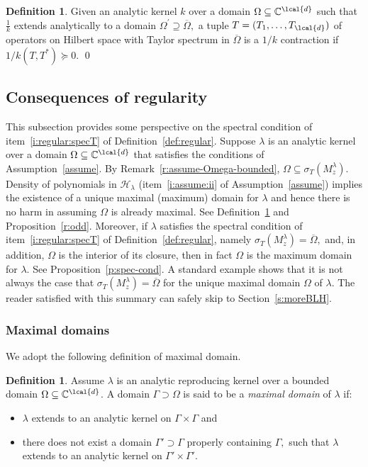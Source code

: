 \documentclass[a4paper,reqno,index]{amsart}
\numberwithin{equation}{section}
\newcommand{\CC}{\mathbb{C}}
\newcommand{\cH}{\mathcal{H}}
\newcommand{\specT}{\sigma_T}  %
\newcommand{\genl}{\lambda} %
\newcommand{\ol}[1]{\overline{#1}}
\theoremstyle{definition}
\newtheorem{definition}[theorem]{Definition}
\begin{document}
\begin{definition}
    \label{1kdef}
       Given an analytic  kernel  $k$ over a domain $\Omega\subseteq \CC^{\lcal{d}}$ such that $\frac{1}{k}$ 
       extends analytically to a domain $\Omega^\prime\supseteq \ol{\Omega},$ 
     a tuple $T=(T_1,\dots,T_{\lcal{d}})$ of operators on Hilbert space with Taylor spectrum in $\overline{\Omega}$
     is a $1/k$ contraction if  $1/k(T,T^*)\succeq 0$. 
\qed\end{definition}


  
\subsection{Consequences of regularity}\label{subsecconseq}
 This subsection provides some perspective on the spectral condition of item~\ref{i:regular:specT} of 
 Definition~\ref{def:regular}.
 Suppose $\lambda$ is an analytic kernel over a domain $\Omega\subseteq \CC^{\lcal{d}}$
 that satisfies the conditions of Assumption~\ref{assume}. 
 By Remark~\ref{r:assume-Omega-bounded}, $\Omega\subseteq \specT(M_z^\lambda).$
 Density of polynomials in $\cH_\lambda$  (item~\ref{i:assume:ii} of Assumption~\ref{assume}) implies the existence
 of a unique maximal (maximum) domain for $\lambda$
 and hence there is no harm in assuming $\Omega$ is
 already maximal. See Definition~\ref{maximaldef} and Proposition~\ref{r:odd}.
 Moreover, if $\lambda$ satisfies the spectral condition of item~\ref{i:regular:specT} of Definition~\ref{def:regular},
 namely $\specT(M_z^\lambda) = \ol{\Omega},$
 and, in addition, $\Omega$ is the interior of its closure, 
 then in fact $\Omega$ is the maximum domain for $\lambda.$ 
 See Proposition~\ref{p:spec-cond}.  A standard example shows that it is not always
 the case that $\specT(M_z^\lambda) = \ol{\Omega}$ for the unique maximal domain $\Omega$ of $\lambda.$
 The reader satisfied with this summary can safely skip to  Section~\ref{s:moreBLH}. 

\subsubsection{Maximal domains}

{We adopt the following definition of maximal domain.} 

 \begin{definition}\label{maximaldef}
 Assume $\genl$ is an analytic reproducing kernel over a bounded domain $\Omega\subseteq \CC^{\lcal{d}}$. A domain $\Gamma\supset \Omega$ is said to be a \textit{maximal domain} of $\genl$ if:
 \begin{itemize}
     \item[(i)] $\genl$ extends to an analytic kernel on $\Gamma\times\Gamma$ and

     \item[(ii)] there does not exist a domain $\Gamma'\supset\Gamma$ properly containing $\Gamma,$ such that $\genl$ extends to an analytic kernel on $\Gamma'\times\Gamma'$.
 \end{itemize}
\end{definition}
\end{document}
